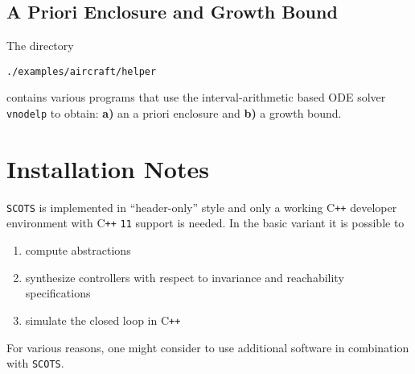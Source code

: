 \documentclass[a4paper]{amsart}
\newcommand\Cpp{C\texttt{++} }
\begin{document}
%

\subsection{A Priori Enclosure and Growth Bound}
The directory 
\begin{lstlisting}[basicstyle=\small\ttfamily]
./examples/aircraft/helper        	
\end{lstlisting}
contains various programs that 
use the interval-arithmetic based ODE solver {\tt vnodelp} to obtain:
{\bf a)} an a priori enclosure and {\bf b)} a growth
bound.


\newpage
\section{Installation Notes}
\label{s:req}

{\tt SCOTS} is implemented in ``header-only'' style and  only a working \Cpp developer environment with \Cpp{\tt11} support
is needed. In the basic variant it is possible to
\begin{enumerate}
  \item compute abstractions
  \item synthesize controllers with respect to invariance and reachability specifications 
  \item simulate the closed loop in \Cpp
\end{enumerate}
For various reasons, one might consider to use additional software in combination with {\tt SCOTS}.
\end{document}
